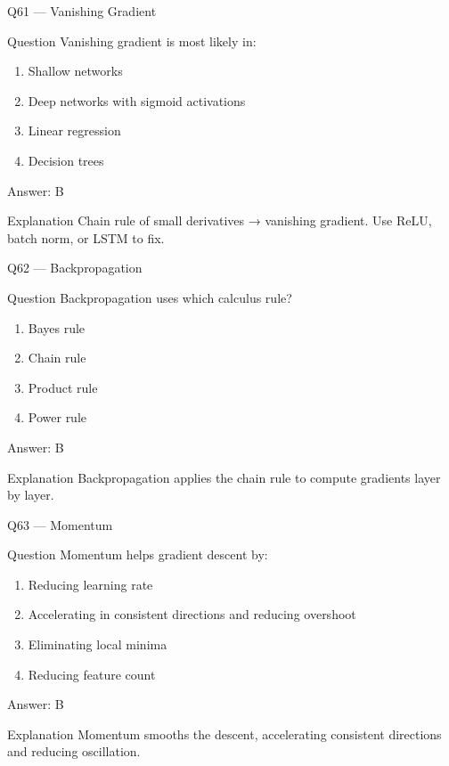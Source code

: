\documentclass[aspectratio=169,8pt]{beamer}
\begin{document}
	\begin{frame}{Q61 --- Vanishing Gradient}
		\begin{block}{Question}
			Vanishing gradient is most likely in:
		\end{block}
		\begin{enumerate}
			\item Shallow networks
			\item Deep networks with sigmoid activations
			\item Linear regression
			\item Decision trees
		\end{enumerate}
		\begin{exampleblock}{Answer: B}\end{exampleblock}
		\begin{block}{Explanation}
			Chain rule of small derivatives → vanishing gradient. Use ReLU, batch norm, or LSTM to fix.
		\end{block}
	\end{frame}
	
	\begin{frame}{Q62 --- Backpropagation}
		\begin{block}{Question}
			Backpropagation uses which calculus rule?
		\end{block}
		\begin{enumerate}
			\item Bayes rule
			\item Chain rule
			\item Product rule
			\item Power rule
		\end{enumerate}
		\begin{exampleblock}{Answer: B}\end{exampleblock}
		\begin{block}{Explanation}
			Backpropagation applies the chain rule to compute gradients layer by layer.
		\end{block}
	\end{frame}
	
	\begin{frame}{Q63 --- Momentum}
		\begin{block}{Question}
			Momentum helps gradient descent by:
		\end{block}
		\begin{enumerate}
			\item Reducing learning rate
			\item Accelerating in consistent directions and reducing overshoot
			\item Eliminating local minima
			\item Reducing feature count
		\end{enumerate}
		\begin{exampleblock}{Answer: B}\end{exampleblock}
		\begin{block}{Explanation}
			Momentum smooths the descent, accelerating consistent directions and reducing oscillation.
		\end{block}
	\end{frame}
	
\end{document}
